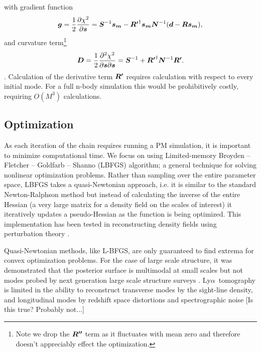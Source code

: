 \documentclass[times]{aastex62}
\def\bi#1{\hbox{\boldmath{$#1$}}}
\newcommand{\lya}{Ly$\alpha$}
\begin{document}
with gradient function
\begin{equation}
\bi{g}=\frac{1}{2}\frac{\partial \chi^2}{\partial \bi{s}}=\bi{S}^{-1}\bi{s_m}-\bi{R'}^\dag\bi{s_m}\bi{N}^{-1}(\bi{d}-\bi{Rs_m}),
\label{eq_cost}
\end{equation}
and curvature term\footnote{Note we drop the $\bi{R''}$ term as it fluctuates with mean zero and therefore doesn't appreciably effect the optimization.} 
\begin{equation}
\bi{D}=\frac{1}{2}\frac{\partial^2 \chi^2}{\partial \bi{s}\partial \bi{s}}=\bi{S}^{-1}+\bi{R'}^\dag\bi{N}^{-1}\bi{R'}. %
\label{eq_curv}
\end{equation}.
Calculation of the derivative term $\bi{R'}$ requires calculation with respect to every initial mode. For a full n-body simulation this would be prohibitively costly, requiring  $O(M^3)$ calculations. 


\subsection{Optimization }
As each iteration of the chain requires running a PM simulation, it is important to minimize computational time. We focus on using Limited-memory Broyden – Fletcher – Goldfarb – Shanno (LBFGS) algorithm;\cite{NumRec} a general technique for solving nonlinear optimization problems. Rather than sampling over the entire parameter space, LBFGS takes a quasi-Newtonian approach, i.e. it is similar to the standard Newton-Ralphson method but instead of calculating the inverse of the entire Hessian (a very large matrix for a density field on the scales of interest) it iteratively updates a pseudo-Hessian as the function is being optimized. This implementation has been tested in reconstructing density fields using perturbation theory \cite{seljak2017towards}.

Quasi-Newtonian methods, like L-BFGS, are only guaranteed to find extrema for convex optimization problems. For the case of large scale structure, it was demonstrated that the posterior surface is multimodal at small scales but not modes probed by next generation large scale structure surveys \cite{2018fengseljakzaldarriaga}. \lya\ tomography is limited in the ability to reconstruct transverse modes by the sight-line density, and longitudinal modes by redshift space distortions and spectrographic noise [Is this true? Probably not...] 
\end{document}
